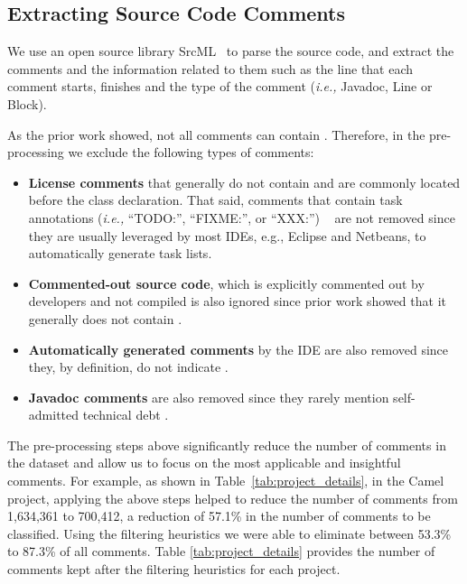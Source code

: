 \subsection{Extracting Source Code Comments}
\label{sub:parse_source_code}

We use an open source library SrcML~\cite{Collard2013SIE} to parse the source code, and extract the comments and the information related to them such as the line that each comment starts, finishes and the type of the comment (\textit{i.e.,} Javadoc, Line or Block). 


As the prior work showed, not all comments can contain \SATD \cite{Potdar2014ICSME,Wehaibi2016SANER}. Therefore,  in the pre-processing we exclude the following types of comments:

\begin{itemize}
\item \textbf{License comments} that generally do not contain \SATD and are commonly located before the class declaration. That said, comments that contain task annotations (\textit{i.e.,} ``TODO:'', ``FIXME:'', or ``XXX:'') ~\cite{Storey2008ICSE} are not removed since they are usually leveraged by most IDEs, e.g., Eclipse and Netbeans, to automatically generate task lists.



\item \textbf{Commented-out source code}, which is explicitly commented out by developers and not compiled is also ignored since prior work showed that it generally does not contain \SATD \cite{Potdar2014ICSME,Wehaibi2016SANER}.


\item \textbf{Automatically generated comments} by the IDE are also removed since they, by definition, do not indicate \SATD. 


\item \textbf{Javadoc comments} are also removed since they rarely mention self-admitted technical debt \cite{Potdar2014ICSME}. 

 
\end{itemize} 


The pre-processing steps above significantly reduce the number of comments in the dataset and allow us to focus on the most applicable and insightful comments. For example, as shown in Table~\ref{tab:project_details}, in the Camel project, applying the above steps helped to reduce the number of comments from 1,634,361 to 700,412, a reduction of 57.1\% in the number of comments to be classified. Using the filtering heuristics we were able to eliminate between 53.3\% to 87.3\% of all comments. Table \ref{tab:project_details} provides the number of comments kept after the filtering heuristics for each project.




